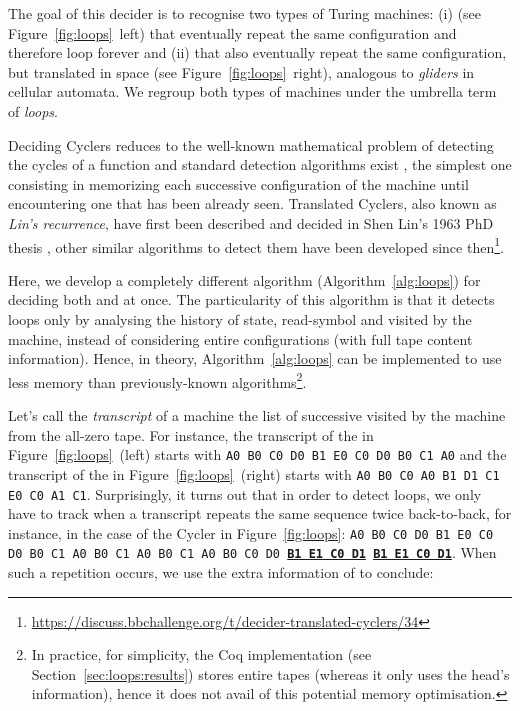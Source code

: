 
The goal of this decider is to recognise two types of Turing machines: (i) \textit{\cyclers} (see Figure~\ref{fig:loops}~left) that eventually repeat the same configuration and therefore loop forever and (ii) \textit{\TCs} that also eventually repeat the same configuration, but translated in space (see Figure~\ref{fig:loops}~right), analogous to \textit{gliders} in cellular automata. We regroup both types of machines under the umbrella term of \textit{loops}.

Deciding Cyclers reduces to the well-known mathematical problem of detecting the cycles of a function and standard detection algorithms exist \cite{wiki:Cycle_detection}, the simplest one consisting in memorizing each successive configuration of the machine until encountering one that has been already seen. Translated Cyclers, also known as \textit{Lin's recurrence}, have first been described and decided in Shen Lin's 1963 PhD thesis \cite{Lin1963}, other similar algorithms to detect them have been developed since then\footnote{\url{https://discuss.bbchallenge.org/t/decider-translated-cyclers/34}}.

Here, we develop a completely different algorithm (Algorithm~\ref{alg:loops}) for deciding both \cyclers and \TCs at once. The particularity of this algorithm is that it detects loops only by analysing the history of state, read-symbol and \headposs visited by the machine, instead of considering entire configurations (\ie with full tape content information). Hence, in theory, Algorithm~\ref{alg:loops} can be implemented to use less memory than previously-known algorithms\footnote{In practice, for simplicity, the Coq implementation (see Section~\ref{sec:loops:results}) stores entire tapes (whereas it only uses the head's information), hence it does not avail of this potential memory optimisation.}.

Let's call the \textit{transcript} of a machine the list of successive \ssps visited by the machine from the all-zero tape. For instance, the transcript of the \cycler in Figure~\ref{fig:loops}~(left) starts with \texttt{A0 B0 C0 D0 B1 E0 C0 D0 B0 C1 A0} and the transcript of the \TC in Figure~\ref{fig:loops}~(right) starts with \texttt{A0 B0 C0 A0 B1 D1 C1 E0 C0 A1 C1}. Surprisingly, it turns out that in order to detect loops, we only have to track when a transcript repeats the same sequence twice back-to-back, for instance, in the case of the Cycler in Figure~\ref{fig:loops}: \texttt{A0 B0 C0 D0 B1 E0 C0 D0 B0 C1 A0 B0 C1 A0 B0 C1 A0 B0 C0 D0 \textbf{\underline{B1 E1 C0 D1}} \textbf{\underline{B1 E1 C0 D1}}}. When such a repetition occurs, we use the extra information of \headpos to conclude:

